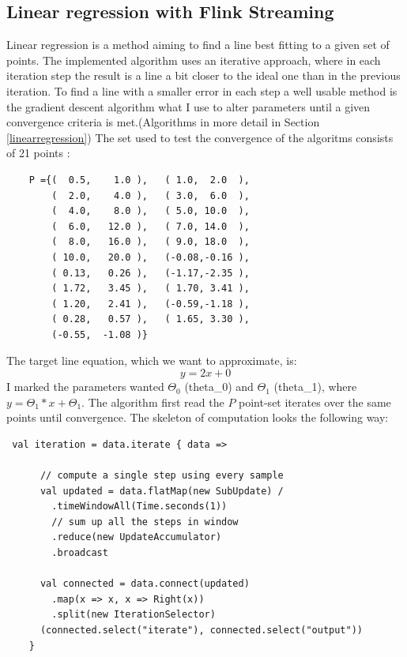 \subsection{Linear regression with Flink Streaming}
Linear regression is a method aiming to find a line best fitting to a given set of points. The implemented algorithm uses an iterative approach, where in each iteration step the result is a line a bit closer to the ideal one than in the previous iteration. To find a line with a smaller error in each step a well usable method is the gradient descent algorithm what I use to alter parameters until a given convergence criteria is met.(Algorithms in more detail in Section \ref{linearregression})
The set used to test the convergence of the algoritms consists of 21 points :
\begin{lstlisting}
 	P ={(  0.5,    1.0 ),	( 1.0,  2.0  ),
		(  2.0,    4.0 ),	( 3.0,  6.0  ),
		(  4.0,    8.0 ),	( 5.0, 10.0  ),
		(  6.0,   12.0 ),	( 7.0, 14.0  ),
		(  8.0,   16.0 ),	( 9.0, 18.0  ),
		( 10.0,   20.0 ),	(-0.08,-0.16 ),
		( 0.13,   0.26 ),	(-1.17,-2.35 ),
		( 1.72,   3.45 ),	( 1.70, 3.41 ),
		( 1.20,   2.41 ),	(-0.59,-1.18 ),
		( 0.28,   0.57 ),	( 1.65, 3.30 ),
		(-0.55,  -1.08 )}
\end{lstlisting}
The target line equation, which we want to approximate, is:
\begin{equation}
 y=2x+0
\end{equation}
I marked the parameters wanted $\Theta_0$ (theta_0) and $\Theta_1$ (theta_1), where $y = \Theta_1*x+ \Theta_1$.
The algorithm first read the $P$ point-set iterates over the same points until convergence. The skeleton of computation looks the following way:
\begin{lstlisting}
 val iteration = data.iterate { data =>
      
      // compute a single step using every sample
      val updated = data.flatMap(new SubUpdate) /
        .timeWindowAll(Time.seconds(1))
        // sum up all the steps in window
        .reduce(new UpdateAccumulator) 
        .broadcast

      val connected = data.connect(updated)
        .map(x => x, x => Right(x))
        .split(new IterationSelector)
      (connected.select("iterate"), connected.select("output"))
    }
\end{lstlisting}



